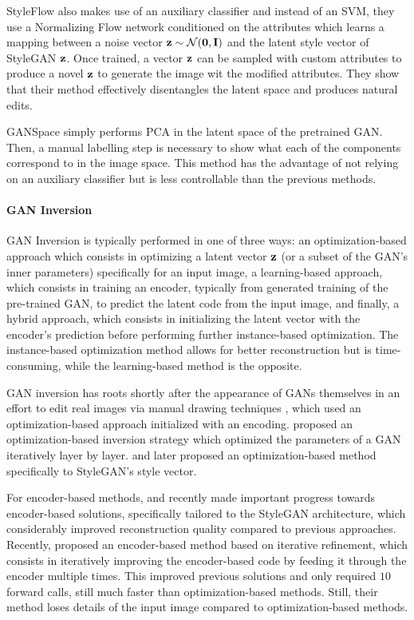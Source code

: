 StyleFlow \citep{abdal2020styleflow} 
 also makes use of an auxiliary classifier and instead of 
an SVM, they use a Normalizing Flow network conditioned on the attributes
which learns a mapping between a noise vector $\mathbf{z} \sim \mathcal{N}(\mathbf{0}, \mathbf{I})$ and the 
latent style vector of StyleGAN $\mathbf{z}$. Once trained, a vector $\mathbf{z}$ can be 
sampled with custom attributes to produce a novel $\mathbf{z}$ to generate 
the image wit the modified attributes. They show that their method 
effectively disentangles the latent space and produces natural edits.

GANSpace \citep{harkonen2020ganspace} 
 simply performs PCA in the latent space of the 
pretrained \ac{GAN}. Then, a manual labelling step is necessary to show 
what each of the components correspond to in the image space. This method 
has the advantage of not relying on an auxiliary classifier but is less 
controllable than the previous methods.



\paragraph{GAN Inversion} 

GAN Inversion is typically performed in one of three ways: an optimization-based 
approach which consists in optimizing a latent vector $\mathbf{z}$ (or a subset of the 
\ac{GAN}'s inner parameters) specifically for an input image, a learning-based 
approach, which consists in training an encoder, typically from generated training 
of the pre-trained \ac{GAN}, to predict the latent code from the input image, 
and finally, a hybrid approach, which consists in initializing the latent 
vector with the encoder's prediction before performing further instance-based 
optimization. The instance-based optimization method allows for better 
reconstruction but is time-consuming, while the learning-based method is the 
opposite.

GAN inversion has roots shortly after the appearance of \ac{GAN}s 
themselves in an effort to edit real images 
via manual drawing techniques \citep{zhu2016generative, bau2020semantic},
which used an optimization-based approach initialized with an encoding.
\cite{bau2019seeing} proposed an optimization-based inversion strategy 
which optimized the parameters of a \ac{GAN} iteratively layer by layer.
\cite{abdal2019image2stylegan} and later \cite{abdal2020} proposed 
an optimization-based method specifically to StyleGAN's style vector.

For encoder-based methods, \cite{zhu2020indomain, psp} and \cite {e4e}
recently made important progress towards encoder-based solutions, specifically 
tailored to the StyleGAN architecture, which considerably improved 
reconstruction quality compared to previous approaches. Recently, \cite{alaluf2021restyle}
proposed an encoder-based method based on iterative refinement, which consists 
in iteratively improving the encoder-based code by feeding it through the 
encoder multiple times. This improved previous solutions and only required 
$10$ forward calls, still much faster than optimization-based methods. Still,
their method loses details of the input image compared to optimization-based methods.

